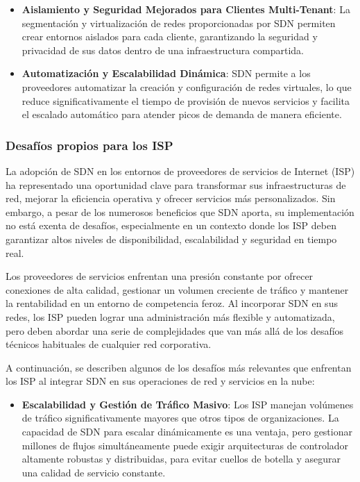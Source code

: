 {\begin{itemize}
                    \item \textbf{Aislamiento y Seguridad Mejorados para Clientes Multi-Tenant}: La segmentación y virtualización de redes proporcionadas por SDN permiten crear entornos aislados para cada cliente, garantizando la seguridad y privacidad de sus datos dentro de una infraestructura compartida.
                
                    \item \textbf{Automatización y Escalabilidad Dinámica}: SDN permite a los proveedores automatizar la creación y configuración de redes virtuales, lo que reduce significativamente el tiempo de provisión de nuevos servicios y facilita el escalado automático para atender picos de demanda de manera eficiente.
                \end{itemize}

            \subsubsection{Desafíos propios para los ISP}
                La adopción de SDN en los entornos de proveedores de servicios de Internet (ISP) ha representado una oportunidad clave para transformar sus infraestructuras de red, mejorar la eficiencia operativa y ofrecer servicios más personalizados. Sin embargo, a pesar de los numerosos beneficios que SDN aporta, su implementación no está exenta de desafíos, especialmente en un contexto donde los ISP deben garantizar altos niveles de disponibilidad, escalabilidad y seguridad en tiempo real.
                
                Los proveedores de servicios enfrentan una presión constante por ofrecer conexiones de alta calidad, gestionar un volumen creciente de tráfico y mantener la rentabilidad en un entorno de competencia feroz. Al incorporar SDN en sus redes, los ISP pueden lograr una administración más flexible y automatizada, pero deben abordar una serie de complejidades que van más allá de los desafíos técnicos habituales de cualquier red corporativa.
                
                A continuación, se describen algunos de los desafíos más relevantes que enfrentan los ISP al integrar SDN en sus operaciones de red y servicios en la nube:
                
                \begin{itemize}
                    \item \textbf{Escalabilidad y Gestión de Tráfico Masivo}: Los ISP manejan volúmenes de tráfico significativamente mayores que otros tipos de organizaciones. La capacidad de SDN para escalar dinámicamente es una ventaja, pero gestionar millones de flujos simultáneamente puede exigir arquitecturas de controlador altamente robustas y distribuidas, para evitar cuellos de botella y asegurar una calidad de servicio constante.
                

\end{itemize}}

